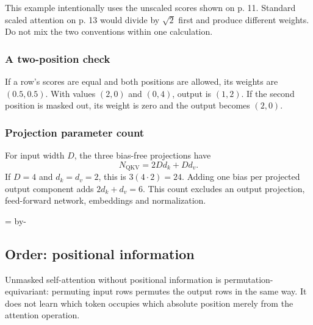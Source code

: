 \documentclass[11pt]{article}
\newcommand{\newsubsection}[1]{\par\begingroup\skip0=\pagegoal\advance\skip0 by-\pagetotal\ifdim\skip0<12\baselineskip\newpage\fi\endgroup\subsection{#1}}
\begin{document}
This example intentionally uses the unscaled scores shown on p. 11. Standard scaled attention on p. 13 would divide by $\sqrt{2}$ first and produce different weights. Do not mix the two conventions within one calculation.

\subsubsection{A two-position check}
If a row's scores are equal and both positions are allowed, its weights are $(0.5,0.5)$. With values $(2,0)$ and $(0,4)$, output is $(1,2)$. If the second position is masked out, its weight is zero and the output becomes $(2,0)$.

\subsubsection{Projection parameter count}
For input width $D$, the three bias-free projections have
\[
N_{\mathrm{QKV}}=2Dd_k+Dd_v.
\]
If $D=4$ and $d_k=d_v=2$, this is $3(4\cdot2)=24$. Adding one bias per projected output component adds $2d_k+d_v=6$. This count excludes an output projection, feed-forward network, embeddings and normalization.

\newsubsection{Order: positional information}
Unmasked self-attention without positional information is permutation-equivariant: permuting input rows permutes the output rows in the same way. It does not learn which token occupies which absolute position merely from the attention operation.
\end{document}
